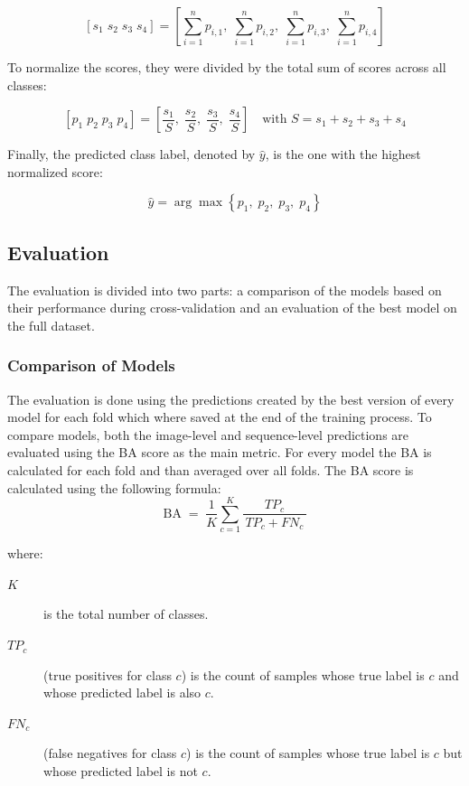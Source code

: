     \[
    [s_{1}\; s_{2}\; s_{3}\; s_{4}] = \left[ \sum_{i=1}^n p_{i,1},\; \sum_{i=1}^n p_{i,2},\; \sum_{i=1}^n p_{i,3},\; \sum_{i=1}^n p_{i,4} \right]
    \]

    To normalize the scores, they were divided by the total sum of scores across all classes:

    \[
    [p_{1}\; p_{2}\; p_{3}\; p_{4}] = \left[ \frac{s_1}{S},\; \frac{s_2}{S},\; \frac{s_3}{S},\; \frac{s_4}{S} \right] \quad \text{with } S = s_1 + s_2 + s_3 + s_4
    \]


    Finally, the predicted class label, denoted by \( \hat{y} \), is the one with the highest normalized score:

    \[
    \hat{y} = \arg\max \left\{p_1,\; p_2,\; p_3,\; p_4\right\}
    \]

    \subsection{Evaluation}
    The evaluation is divided into two parts: a comparison of the models based on their performance during cross-validation and an evaluation of the best model on the full dataset.

    \subsubsection{Comparison of Models}
    The evaluation is done using the predictions created by the best version of every model for each fold which where saved at the end of the training process.
    To compare models, both the image-level and sequence-level predictions are evaluated using the \ac{BA} score \autocite{brodersenBalancedAccuracyIts2010} as the main metric.
    For every model the \ac{BA} is calculated for each fold and than averaged over all folds.
    The \ac{BA} score is calculated using the following formula:
    \begin{equation}
    \text{BA}
    \;=\;
    \frac{1}{K} \sum_{c=1}^{K}
        \frac{TP_{c}}{\,TP_{c} + FN_{c}\,}
    \end{equation}

    \noindent where:
    \begin{description}
        \item[\(K\)] is the total number of classes.
        \item[\(TP_{c}\)] (true positives for class \(c\)) is the count of samples whose true label is \(c\) and whose predicted label is also \(c\).
        \item[\(FN_{c}\)] (false negatives for class \(c\)) is the count of samples whose true label is \(c\) but whose predicted label is not \(c\).
    \end{description}

